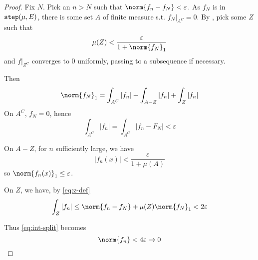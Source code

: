 \documentclass{scrartcl}
\begin{document}
\begin{proof}
  Fix $N$. Pick an $n>N$ such that $\norm{f_n-f_N}<\varepsilon$. As $f_N$ is in $\mathtt{step}(\mu,E)$, there is some set $A$ of finite measure s.t. $f_N|_{A^C}=0$. By , pick some $Z$ such that
  \begin{equation}
    \mu(Z)<\frac{\varepsilon}{1+\norm{f_N}_1}
    \label{eq:z-def}
  \end{equation}
  and $f|_{Z^C}$ converges to $0$ uniformly, passing to a subsequence if necessary. 
  
  Then
  \begin{equation}
  \norm{f_N}_1= \int_{A^C} |f_n| + \int_{A-Z} |f_n| +\int_Z |f_n|
  \label{eq:int-split}
  \end{equation}
  On $A^C$, $f_N=0$, hence
  \[
  \int_{A^C} |f_n|=\int_{A^C} |f_n-F_N| <\varepsilon
  \]

  On $A-Z$, for $n$ sufficiently large, we have
  \[
  |f_n(x)|< \frac \varepsilon {1+\mu(A)}
  \]
  so $\norm{f_n(x)}_1 \leq \varepsilon$. 

  On $Z$, we have, by \cref{eq:z-def}
  \[
  \int_Z |f_n| \leq \norm{f_n-f_N} +\mu(Z)\norm {f_N}_1 < 2\varepsilon 
  \]
  
  Thus \cref{eq:int-split} becomes
  \[
  \norm{f_n}< 4\varepsilon \to 0
  \]
\end{proof}
\end{document}
